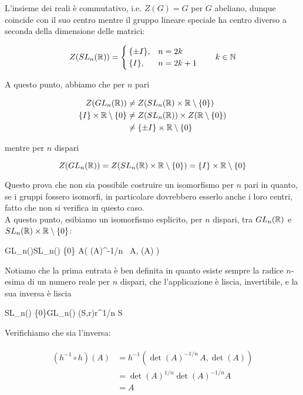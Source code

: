 L'insieme dei reali è commutativo, i.e. $ Z(G) = G $ per $ G $ abeliano, dunque coincide con il suo centro mentre il gruppo lineare speciale ha centro diverso a seconda della dimensione delle matrici:

\begin{equation}
	Z(SL_{n}(\R)) = %
	\begin{cases}
		\{ \pm I \}, & n = 2 k \\
		\{ I \}, & n = 2 k + 1
	\end{cases}%
	\qquad k \in \N
\end{equation}

A questo punto, abbiamo che per $ n $ pari

\begin{align}
	\begin{split}
		Z(GL_{n}(\mathbb{R})) &\neq Z(SL_{n}(\mathbb{R}) \times \mathbb{R} \setminus \{0\})\\
		\{ I \} \times \mathbb{R} \setminus \{0\} &\neq Z(SL_{n}(\mathbb{R})) \times Z(\mathbb{R} \setminus \{0\})\\
		&\neq \{ \pm I \} \times \mathbb{R} \setminus \{0\}
	\end{split}
\end{align}

mentre per $ n $ dispari

\begin{equation}
	Z(GL_{n}(\mathbb{R})) = Z(SL_{n}(\mathbb{R}) \times \mathbb{R} \setminus \{0\}) = \{ I \} \times \mathbb{R} \setminus \{0\}
\end{equation}

Questo prova che non sia possibile costruire un isomorfismo per $ n $ pari in quanto, se i gruppi fossero isomorfi, in particolare dovrebbero esserlo anche i loro centri, fatto che non si verifica in questo caso.\\
A questo punto, esibiamo un isomorfismo esplicito, per $ n $ dispari, tra $ GL_{n}(\mathbb{R}) $ e $ SL_{n}(\mathbb{R}) \times \mathbb{R} \setminus \{0\} $:

	{GL_{n}(\R)}{SL_{n}(\R) \times \R \setminus \{0\}}
	{A}{\left( \det(A)^{-1/n} \, A, \det(A) \right)}

Notiamo che la prima entrata è ben definita in quanto esiste sempre la radice $ n $-esima di un numero reale per $ n $ dispari, che l'applicazione è liscia, invertibile, e la sua inversa è liscia

	{SL_{n}(\R) \times \R \setminus \{0\}}{GL_{n}(\R)}
	{(S,r)}{r^{1/n} S}
	
Verifichiamo che sia l'inversa:

\begin{align}
	\begin{split}
		(h^{-1} \circ h)(A) &= h^{-1} \left( \det(A)^{-1/n} \, A, \det(A) \right) \\
		&= \det(A)^{1/n} \det(A)^{-1/n} A \\
		&= A
	\end{split}
\end{align}

